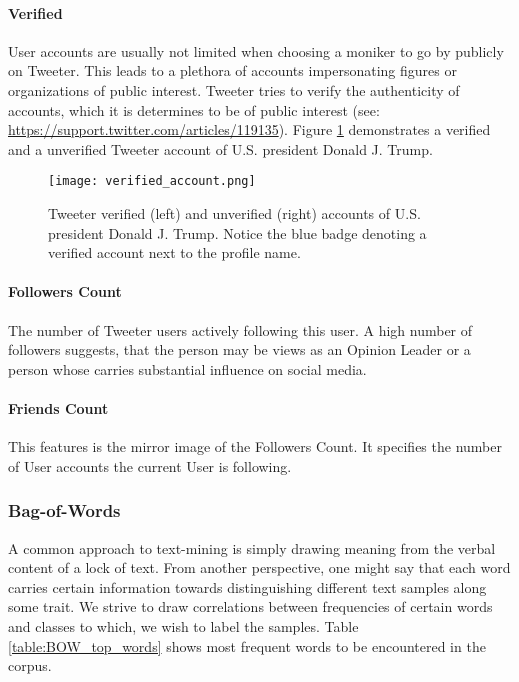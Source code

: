 			\paragraph{Verified}	
				User accounts are usually not limited when choosing a moniker to go by publicly on Tweeter. This leads to a plethora of accounts impersonating figures or organizations of public interest. Tweeter tries to verify the authenticity of accounts, which it is determines to be of public interest (see: \url{https://support.twitter.com/articles/119135}). Figure \ref{fig:verified_accounts} demonstrates a verified and a unverified Tweeter account of U.S. president Donald J. Trump.\\

				
				\begin{figure}[h]
					\centering
					\captionsetup{width=0.8\textwidth}
					\texttt{[image: verified\_account.png]}
					\caption[Tweeter Verified Accounts]{
						\footnotesize{
							Tweeter verified (left) and unverified (right) accounts of U.S. president Donald J. Trump. Notice the blue badge denoting a verified account next to the profile name.
						}
					} 
					\label{fig:verified_accounts}
				\end{figure}
			
			\paragraph{Followers Count}
				The number of Tweeter users actively following this user. A high number of followers suggests, that the person may be views as an Opinion Leader or a person whose carries substantial influence on social media.
				
			\paragraph{Friends Count}
				This features is the mirror image of the Followers Count. It specifies the number of User accounts the current User is following.
					
		\subsubsection{Bag-of-Words}
			A common approach to text-mining is simply drawing meaning from the verbal content of a lock of text. From another perspective, one might say that each word carries certain information towards distinguishing different text samples along some trait. We strive to draw correlations between frequencies of certain words and classes to which, we wish to label the samples. Table \ref{table:BOW_top_words} shows most frequent words to be encountered in the corpus. 
			

